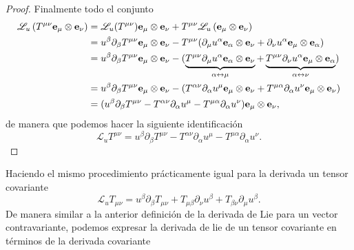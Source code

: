 \begin{proof}
    Finalmente todo el conjunto
    \begin{equation}
        \begin{aligned}
            \mathscr{L}_u \left( T^{\mu \nu} \mathbf{e_\mu} \otimes \mathbf{e_\nu} \right) & = \mathscr{L}_u(T^{\mu \nu}) \mathbf{e_\mu} \otimes \mathbf{e_\nu} + T^{\mu \nu} \mathscr{L}_u \left( \mathbf{e_\mu} \otimes \mathbf{e_\nu} \right)                                                                                                                                                                \\
                                                                                 & = u^\beta \partial_\beta T^{\mu \nu}  \mathbf{e_\mu} \otimes \mathbf{e_\nu}  - T^{\mu \nu}( \partial_\mu u^\alpha \mathbf{e_\alpha} \otimes  \mathbf{e_\nu} +\partial_\nu u^\alpha \mathbf{e_\mu}\otimes\mathbf{e_\alpha} )                                                                                                  \\
                                                                                 & = u^\beta \partial_\beta T^{\mu \nu}  \mathbf{e_\mu} \otimes \mathbf{e_\nu}  - ( \underbrace{T^{\mu \nu} \partial_\mu u^\alpha \mathbf{e_\alpha} \otimes  \mathbf{e_\nu} }_{\alpha \leftrightarrow \mu}+\underbrace{T^{\mu \nu} \partial_\nu u^\alpha \mathbf{e_\mu}\otimes\mathbf{e_\alpha} }_{\alpha \leftrightarrow \nu}) \\
                                                                                 & = u^\beta \partial_\beta T^{\mu \nu}  \mathbf{e_\mu} \otimes \mathbf{e_\nu}  - ( T^{\alpha \nu} \partial_\alpha u^\mu \mathbf{e_\mu} \otimes  \mathbf{e_\nu} +T^{\mu \alpha} \partial_\alpha u^\nu \mathbf{e_\mu}\otimes\mathbf{e_\nu} )                                                                                     \\
                                                                                 & = (u^\beta \partial_\beta T^{\mu \nu}   -  T^{\alpha \nu} \partial_\alpha u^\mu  -T^{\mu \alpha} \partial_\alpha u^\nu  )\mathbf{e_\mu}\otimes\mathbf{e_\nu},
        \end{aligned}
    \end{equation}
    de manera que  podemos hacer la siguiente identificación
    \begin{equation}
        \mathscr{L}_u T^{\mu \nu} = u^\beta \partial_\beta T^{\mu \nu}   -  T^{\alpha \nu} \partial_\alpha u^\mu  -T^{\mu \alpha} \partial_\alpha u^\nu.
    \end{equation}
\end{proof}

\noindent Haciendo el mismo procedimiento prácticamente igual  para la derivada un tensor covariante
\begin{equation}
    \mathscr{L}_u T_{\mu \nu} = u^\beta \partial_\beta T_{\mu \nu}   +  T_{\mu \beta } \partial_\nu u^\beta  + T_{ \beta \nu} \partial_\mu u^\beta.
\end{equation}
De manera similar a la anterior definición de la derivada de Lie para un vector contravariante, podemos expresar la derivada de lie de un tensor covariante en términos de la derivada covariante

